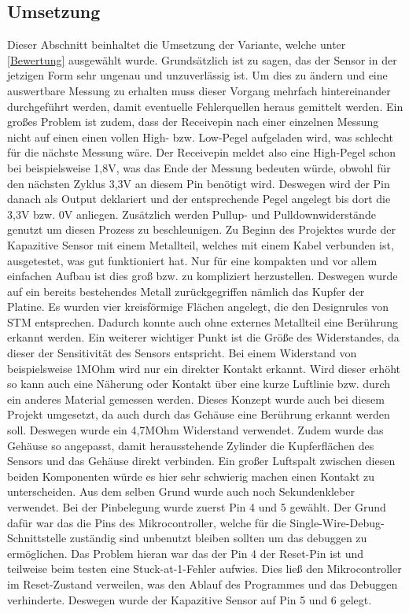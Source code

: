 \documentclass[a4paper,
DIV=13,
12pt,
BCOR=10mm,
department=FakEI,
parskip=half,
automark,
]{article}
\begin{document}
\subsection{Umsetzung}
Dieser Abschnitt beinhaltet die Umsetzung der Variante, welche unter \ref{Bewertung} ausgewählt wurde. Grundsätzlich ist zu sagen, das der Sensor in der jetzigen Form sehr ungenau und unzuverlässig ist. Um dies zu ändern und eine auswertbare Messung zu erhalten muss dieser Vorgang mehrfach hintereinander durchgeführt werden, damit eventuelle Fehlerquellen heraus gemittelt werden. Ein großes Problem ist zudem, dass der Receivepin nach einer einzelnen Messung nicht auf einen einen vollen High- bzw. Low-Pegel aufgeladen wird, was schlecht für die nächste Messung wäre. Der Receivepin meldet also eine High-Pegel schon bei beispielsweise 1,8V, was das Ende der Messung bedeuten würde, obwohl für den nächsten Zyklus 3,3V an diesem Pin benötigt wird. Deswegen wird der Pin danach als Output deklariert und der entsprechende Pegel angelegt bis dort die 3,3V bzw. 0V anliegen. Zusätzlich werden Pullup- und Pulldownwiderstände genutzt um diesen Prozess zu beschleunigen. Zu Beginn des Projektes wurde der Kapazitive Sensor mit einem Metallteil, welches mit einem Kabel verbunden ist, ausgetestet, was gut funktioniert hat. Nur für eine kompakten und vor allem einfachen Aufbau ist dies groß bzw. zu kompliziert herzustellen. Deswegen wurde auf ein bereits bestehendes Metall zurückgegriffen nämlich das Kupfer der Platine. Es wurden vier kreisförmige Flächen angelegt, die den Designrules 
von STM entsprechen. Dadurch konnte auch ohne externes Metallteil eine Berührung erkannt werden.
 Ein weiterer wichtiger Punkt ist die Größe des Widerstandes, da dieser der Sensitivität des Sensors entspricht. Bei einem Widerstand von beispielsweise 1MOhm wird nur ein direkter Kontakt erkannt. Wird dieser erhöht so kann auch eine Näherung oder Kontakt über eine kurze Luftlinie bzw. durch ein anderes Material gemessen werden. Dieses Konzept wurde auch bei diesem Projekt umgesetzt, da auch durch das Gehäuse eine Berührung erkannt werden soll. Deswegen wurde ein 4,7MOhm Widerstand verwendet. Zudem wurde das Gehäuse so angepasst, damit herausstehende Zylinder die Kupferflächen des Sensors und das Gehäuse direkt verbinden. Ein großer Luftspalt zwischen diesen beiden Komponenten würde es hier sehr schwierig machen einen Kontakt zu unterscheiden. Aus dem selben Grund wurde auch noch Sekundenkleber verwendet. Bei der Pinbelegung wurde zuerst Pin 4 und 5 gewählt. Der Grund dafür war das die Pins des Mikrocontroller, welche für die Single-Wire-Debug-Schnittstelle zuständig sind unbenutzt bleiben sollten um das debuggen zu ermöglichen. Das Problem hieran war das der Pin 4 der Reset-Pin ist und teilweise beim testen eine Stuck-at-1-Fehler aufwies. Dies ließ den Mikrocontroller im Reset-Zustand verweilen, was den Ablauf des Programmes und das Debuggen verhinderte. Deswegen wurde der Kapazitive Sensor auf Pin 5 und 6 gelegt.
 
\end{document}
